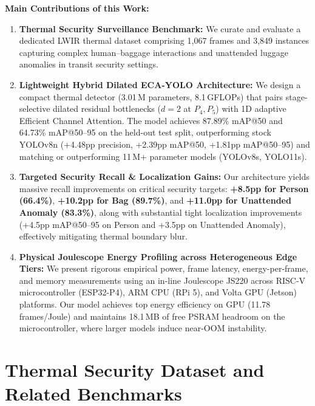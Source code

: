 \documentclass[journal,twoside,web]{ieeecolor}
\begin{document}
\textbf{Main Contributions of this Work:}
\begin{enumerate}
    \item \textbf{Thermal Security Surveillance Benchmark:} We curate and evaluate a dedicated LWIR thermal dataset comprising 1,067 frames and 3,849 instances capturing complex human--baggage interactions and unattended luggage anomalies in transit security settings.
    \item \textbf{Lightweight Hybrid Dilated ECA-YOLO Architecture:} We design a compact thermal detector (3.01\,M parameters, 8.1\,GFLOPs) that pairs stage-selective dilated residual bottlenecks ($d=2$ at $P_4, P_5$) with 1D adaptive Efficient Channel Attention. The model achieves 87.89\% mAP@50 and 64.73\% mAP@50--95 on the held-out test split, outperforming stock YOLOv8n (+4.48pp precision, +2.39pp mAP@50, +1.81pp mAP@50--95) and matching or outperforming 11\,M+ parameter models (YOLOv8s, YOLO11s).
    \item \textbf{Targeted Security Recall & Localization Gains:} Our architecture yields massive recall improvements on critical security targets: \textbf{+8.5pp for Person (66.4\%)}, \textbf{+10.2pp for Bag (89.7\%)}, and \textbf{+11.0pp for Unattended Anomaly (83.3\%)}, along with substantial tight localization improvements (+4.5pp mAP@50--95 on Person and +3.5pp on Unattended Anomaly), effectively mitigating thermal boundary blur.
    \item \textbf{Physical Joulescope Energy Profiling across Heterogeneous Edge Tiers:} We present rigorous empirical power, frame latency, energy-per-frame, and memory measurements using an in-line Joulescope JS220 across RISC-V microcontroller (ESP32-P4), ARM CPU (RPi 5), and Volta GPU (Jetson) platforms. Our model achieves top energy efficiency on GPU (11.78\,frames/Joule) and maintains 18.1\,MB of free PSRAM headroom on the microcontroller, where larger models induce near-OOM instability.
\end{enumerate}

\section{Thermal Security Dataset and Related Benchmarks}
\label{sec:dataset_and_related}
\end{document}
